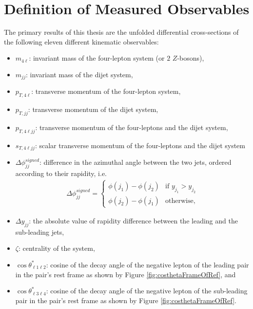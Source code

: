 \section{Definition of Measured Observables}
\label{sec:Obs}

The primary results of this thesis are the unfolded differential cross-sections of the following eleven different kinematic observables:

\begin{itemize}

\item{	$m_{4\ell}$: invariant mass of the four-lepton system (or $2$ $Z$-bosons),}
\item{ 	$m_{jj}$:  invariant mass of the dijet system,}
\item{	$p_{T,4\ell}$: transverse momentum of the four-lepton system,}
\item{	$p_{T, jj}$: transverse momentum of the dijet system,}
\item{	$p_{T,4\ell jj}$: transverse momentum of the four-leptons and the dijet system,}
\item{	$s_{T,4\ell jj}$: scalar transverse momentum of the four-leptons and the dijet system}
\item{ 	$\Delta \phi _{jj}^{signed}$: difference in the azimuthal angle between the two jets, ordered according to their rapidity, i.e. 
\begin{align*}
	\Delta \phi _{jj}^{signed} = 
	\begin{cases}
	\phi(j_1)-\phi(j_2) & \text{if $y_{j_1} > y_{j_2}$}\\
	\phi(j_2)-\phi(j_1) & \text{otherwise,}
	\end{cases} 
\end{align*}
}
\item{ $\Delta y_{jj}$: the absolute value of rapidity difference between the leading and the sub-leading jets,}
\item{ $\zeta$: centrality of the system,}
\item{ $\cos \theta^{*}_{\ell 1 \ell 2}$: cosine of the decay angle of the negative lepton of the leading pair in the pair's rest frame as shown by Figure \ref{fig:costhetaFrameOfRef}, and }
\item{ $\cos \theta^{*}_{\ell 3 \ell 4}$: cosine of the decay angle of the negative lepton of the sub-leading pair in the pair's rest frame as shown by Figure \ref{fig:costhetaFrameOfRef}. }

\end{itemize}

